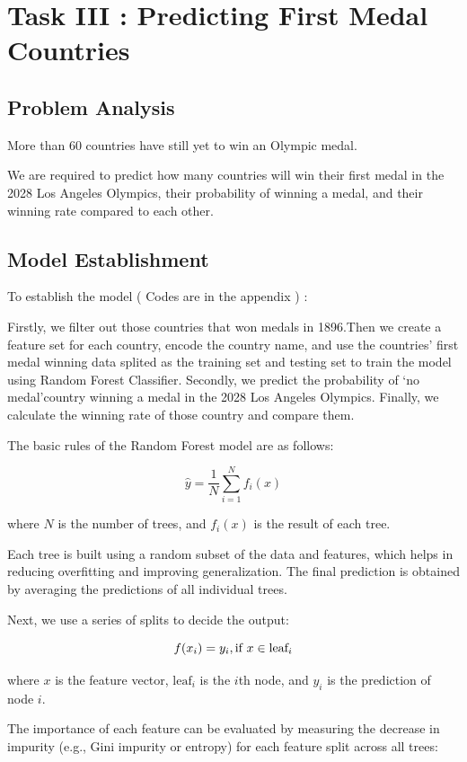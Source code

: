\section{Task III : Predicting First Medal Countries}
\subsection{Problem Analysis}

More than 60 countries have still yet to win an Olympic medal.

We are required to predict how many countries will win their first medal in the 2028 Los Angeles Olympics, their probability of winning a medal, and their winning rate compared to each other.
\subsection{Model Establishment}

To establish the model ( Codes are in the appendix ) :

Firstly, we filter out those countries that won medals in 1896.Then we create a feature set for each country, encode the country name, and use the countries' first medal winning data splited as the training set and testing set to train the model using Random Forest Classifier.
Secondly, we predict the probability of `no medal'country winning a medal in the 2028 Los Angeles Olympics.
Finally, we calculate the winning rate of those country and compare them.

The basic rules of the Random Forest model are as follows:

$$\hat{y} = \frac{1}{N} \sum_{i=1}^{N} f_i(x)$$

where $N$ is the number of trees, and $f_i(x)$ is the result of each tree.

Each tree is built using a random subset of the data and features, which helps in reducing overfitting and improving generalization. The final prediction is obtained by averaging the predictions of all individual trees.

Next, we use a series of splits to decide the output:

$$f(x_i) =  
    y_i, \text{if } x \in \text{leaf}_i \\ 
$$

where $x$ is the feature vector, $\text{leaf}_i$ is the $i$th node, and $y_i$ is the prediction of node $i$.

The importance of each feature can be evaluated by measuring the decrease in impurity (e.g., Gini impurity or entropy) for each feature split across all trees:

